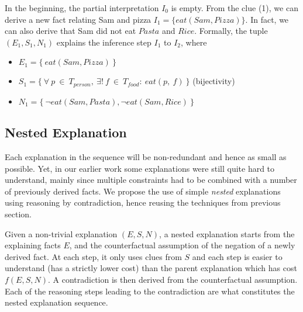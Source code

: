 In the beginning, the partial interpretation $I_0$ is empty. From the clue (1), we can derive a new fact relating Sam and pizza $I_1 = \{eat(Sam, Pizza)\}$. In fact, we can also derive that Sam did not eat $Pasta$ and $Rice$.
Formally, the tuple $(E_1, S_1, N_1)$ explains the inference step $I_1$ to $I_2$, where
\begin{itemize}
   \item $E_1 = \{ \ eat(Sam, Pizza) \ \}$
   \item $S_1 = \{ \ \forall \ p \ \in \ T_{person}, \ \exists! \ f \ \in \ T_{food} :\ eat(p,\ f) \ \}$ (bijectivity)
   \item $N_1 = \{\ \lnot eat(Sam, Pasta), \lnot  eat(Sam, Rice)\ \}$
\end{itemize}


\subsection{Nested Explanation}
Each explanation in the sequence will be non-redundant and hence as small as possible. 
Yet, in our earlier work some explanations were still quite hard to understand, mainly since multiple constraints had to be combined with a number of previously derived facts. 
We propose the use of simple \textit{nested} explanations using reasoning by contradiction, hence reusing the techniques from previous section. 

Given a non-trivial explanation $(E,S,N)$, a nested explanation starts from the explaining facts $E$, and the counterfactual assumption of the negation of a newly derived fact. 
At each step, it only uses clues from $S$ and each step is easier to understand (has a strictly lower cost) than the parent explanation which has cost $f(E,S,N)$. 
A contradiction is then derived from the counterfactual assumption.
Each of the reasoning steps leading to the contradiction are what constitutes the nested explanation sequence.
